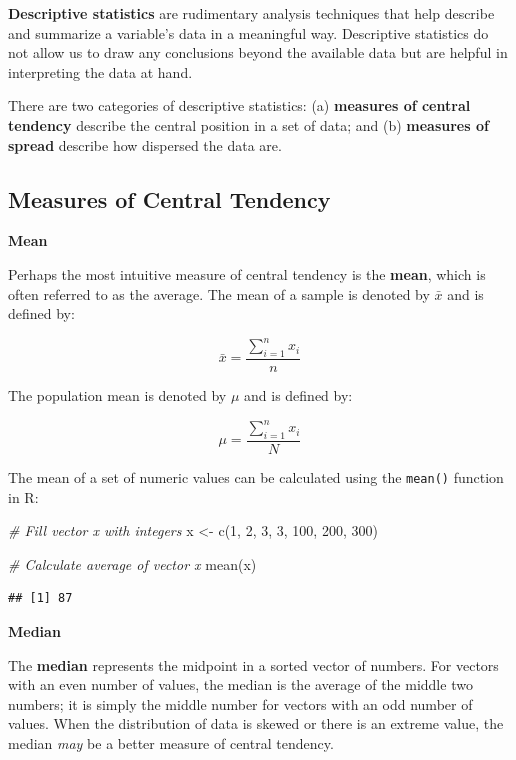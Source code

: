 \documentclass[
]{book}
\newenvironment{Shaded}{\begin{snugshade}}{\end{snugshade}}
\newcommand{\CommentTok}[1]{\textcolor[rgb]{0.56,0.35,0.01}{\textit{#1}}}
\newcommand{\DecValTok}[1]{\textcolor[rgb]{0.00,0.00,0.81}{#1}}
\newcommand{\FunctionTok}[1]{\textcolor[rgb]{0.00,0.00,0.00}{#1}}
\newcommand{\NormalTok}[1]{#1}
\newcommand{\OtherTok}[1]{\textcolor[rgb]{0.56,0.35,0.01}{#1}}
\begin{document}
\textbf{Descriptive statistics} are rudimentary analysis techniques that help describe and summarize a variable's data in a meaningful way. Descriptive statistics do not allow us to draw any conclusions beyond the available data but are helpful in interpreting the data at hand.

There are two categories of descriptive statistics: (a) \textbf{measures of central tendency} describe the central position in a set of data; and (b) \textbf{measures of spread} describe how dispersed the data are.

\hypertarget{measures-of-central-tendency}{%
\subsection{Measures of Central Tendency}\label{measures-of-central-tendency}}

\textbf{Mean}

Perhaps the most intuitive measure of central tendency is the \textbf{mean}, which is often referred to as the average. The mean of a sample is denoted by \(\bar{x}\) and is defined by:

\[ \bar{x} = \frac{\displaystyle\sum_{i=1}^{n} x_{i}}{n} \]

The population mean is denoted by \(\mu\) and is defined by:

\[ \mu = \frac{\displaystyle\sum_{i=1}^{n} x_{i}}{N} \]

The mean of a set of numeric values can be calculated using the \texttt{mean()} function in R:

\begin{Shaded}
\begin{Highlighting}[]
\CommentTok{\# Fill vector x with integers}
\NormalTok{x }\OtherTok{\textless{}{-}} \FunctionTok{c}\NormalTok{(}\DecValTok{1}\NormalTok{, }\DecValTok{2}\NormalTok{, }\DecValTok{3}\NormalTok{, }\DecValTok{3}\NormalTok{, }\DecValTok{100}\NormalTok{, }\DecValTok{200}\NormalTok{, }\DecValTok{300}\NormalTok{)}

\CommentTok{\# Calculate average of vector x}
\FunctionTok{mean}\NormalTok{(x)}
\end{Highlighting}
\end{Shaded}

\begin{verbatim}
## [1] 87
\end{verbatim}

\textbf{Median}

The \textbf{median} represents the midpoint in a sorted vector of numbers. For vectors with an even number of values, the median is the average of the middle two numbers; it is simply the middle number for vectors with an odd number of values. When the distribution of data is skewed or there is an extreme value, the median \emph{may} be a better measure of central tendency.
\end{document}
